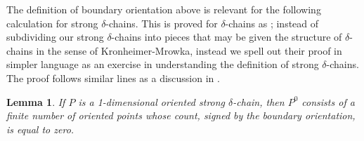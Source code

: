 \documentclass[10pt,a4paper]{amsart}
\newtheorem{lemma}[theorem]{Lemma}
\theoremstyle{definition}
\theoremstyle{remark}
\numberwithin{figure}{qchap}
\begin{document}
The definition of boundary orientation above is relevant for the following calculation for strong $\delta$-chains. This is proved for $\delta$-chains as \cite[Theorem~21.3.2]{KMSW}; instead of subdividing our strong $\delta$-chains into pieces that may be given the structure of $\delta$-chains in the sense of Kronheimer-Mrowka, instead we spell out their proof in simpler language as an exercise in understanding the definition of strong $\delta$-chains. The proof follows similar lines as a discussion in \cite[Section~2.3]{SS-Invol}.

\begin{lemma}\label{Stokes}If $P$ is a 1-dimensional oriented strong $\delta$-chain, then $P^0$ consists of a finite number of oriented points whose count, signed by the boundary orientation, is equal to zero.
\end{lemma}
\end{document}
